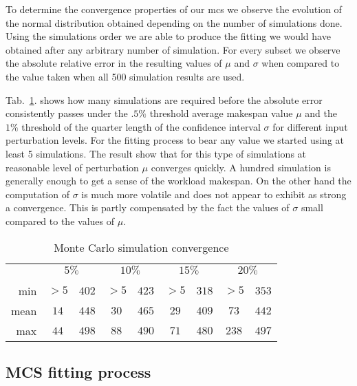 \documentclass[10pt,conference,compsocconf]{IEEEtran}
\newcommand*\rot{\rotatebox{90}}
\begin{document}
To determine the convergence properties of our \ac{mcs} we observe the evolution
of the normal distribution obtained depending on the number of simulations done. 
Using the simulations order we are able to produce the fitting we would
have obtained after any arbitrary number of simulation. For every subset we
observe the absolute relative error in the resulting values of $\mu$ and $\sigma$ 
when compared to the value taken when all 500 simulation results are used. 

Tab.~\ref{tab:mcs-convergence}. shows how many simulations are required before the
absolute error consistently passes under the $.5\%$ threshold average makespan
value $\mu$ and the $1\%$ threshold of the quarter length of the confidence
interval $\sigma$ for different input perturbation levels. For the fitting
process to bear any value we started using at least 5 simulations. The result
show that for this type of simulations at reasonable level of perturbation $\mu$
converges quickly. A hundred simulation is generally enough to get a sense of
the workload makespan. On the other hand the computation of $\sigma$ is much
more volatile and does not appear to exhibit  as strong a convergence. This is
partly compensated by the fact the values of $\sigma$ small compared to the
values of $\mu$.

\begin{table}
	\centering
	\begin{tabular}{|r|cc|cc|cc|cc|}
		\cline{2-9}
		\multicolumn{1}{c|}{}& \multicolumn{2}{c|}{$5\%$}& \multicolumn{2}{c|}{$10\%$}&\multicolumn{2}{c|}{$15\%$}& \multicolumn{2}{c|}{$20\%$}\\
		\multicolumn{1}{c|}{}&\rot{$\mu.ae<.5\%$}&\rot{$\sigma.ae<1\%$}&\rot{$\mu.ae<.5\%$}&\rot{$\sigma.ae<1\%$}&\rot{$\mu.ae<.5\%$}&\rot{$\sigma.ae<1\%$}&\rot{$\mu.ae<.5\%$}&\rot{$\sigma.ae<1\%$}\\
		\hline
		min&$>5$&$402$&$>5$&$423$&$>5$&$318$&$>5$&$353$\\
		mean&$14$&$448$&$30$&$465$&$29$&$409$&$73$&$442$\\
		max&$44$&$498$&$88$&$490$&$71$&$480$&$238$&$497$\\
		\hline
	\end{tabular}
	\caption{Monte Carlo simulation convergence}
	\label{tab:mcs-convergence}
\end{table}

\subsection{\acl{MCS} fitting process}
\end{document}
